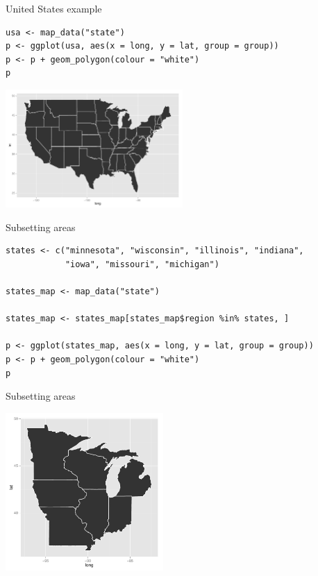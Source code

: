 \documentclass[sans,aspectratio=169,presentation,bigger,fleqn]{beamer}
\begin{document}
\begin{frame}[fragile,label=sec-12]{United States example}
 \scriptsize
\begin{verbatim}
usa <- map_data("state")
p <- ggplot(usa, aes(x = long, y = lat, group = group))
p <- p + geom_polygon(colour = "white")
p
\end{verbatim}

\begin{center}
\includegraphics[height=4.5cm]{./plots/usa.pdf}
\end{center}

\normalsize
\end{frame}
\begin{frame}[fragile,label=sec-13]{Subsetting areas}
 \scriptsize
\begin{verbatim}
states <- c("minnesota", "wisconsin", "illinois", "indiana",
            "iowa", "missouri", "michigan")

states_map <- map_data("state")

states_map <- states_map[states_map$region %in% states, ]

p <- ggplot(states_map, aes(x = long, y = lat, group = group))
p <- p + geom_polygon(colour = "white")
p
\end{verbatim}
\end{frame}
\begin{frame}[label=sec-14]{Subsetting areas}
\begin{center}
\includegraphics[height=6cm]{./plots/some-states.pdf}
\end{center}
\end{frame}
\end{document}
